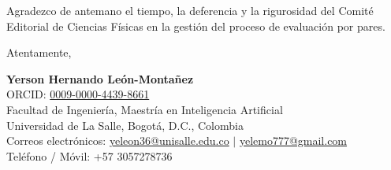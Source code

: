 \documentclass[11pt,a4paper]{article}
\begin{document}
Agradezco de antemano el tiempo, la deferencia y la rigurosidad del Comité Editorial de Ciencias Físicas en la gestión del proceso de evaluación por pares.

\vspace{0.5cm}

\noindent Atentamente,

\vspace{0.6cm}

\noindent\textbf{Yerson Hernando León-Montañez}\\
ORCID: \href{https://orcid.org/0009-0000-4439-8661}{0009-0000-4439-8661}\\
Facultad de Ingeniería, Maestría en Inteligencia Artificial\\
Universidad de La Salle, Bogotá, D.C., Colombia\\
Correos electrónicos: \href{mailto:yeleon36@unisalle.edu.co}{yeleon36@unisalle.edu.co} $|$ \href{mailto:yelemo777@gmail.com}{yelemo777@gmail.com}\\
Teléfono / Móvil: +57 3057278736
\end{document}
